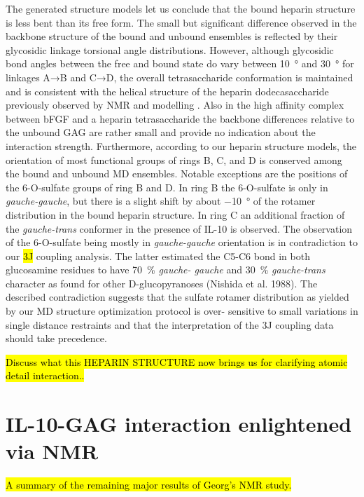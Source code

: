 The generated structure models let us conclude that the bound heparin structure
is less bent than its free form. The small but significant difference observed
in the backbone structure of the bound and unbound ensembles is reflected by
their glycosidic linkage torsional angle distributions. However, although
glycosidic bond angles between the free and bound state do vary between
\SI{10}{\degree} and \SI{30}{\degree} for linkages A→B and C→D, the overall
tetrasaccharide conformation is maintained and is consistent with the helical
structure of the heparin dodecasaccharide previously observed by NMR and
modelling \cite{foster_mulloy_1993}. Also in the high affinity complex between
bFGF and a heparin tetrasaccharide
\cite{faham_heparin_1996,mikhailov_hp_tetra_1996} the backbone differences
relative to the unbound GAG are rather small and provide no indication about the
interaction strength. Furthermore, according to our heparin structure models,
the orientation of most functional groups of rings B, C, and D is conserved
among the bound and unbound MD ensembles. Notable exceptions are the positions
of the 6-O-sulfate groups of ring B and D. In ring B the 6-O-sulfate is only in
\textit{gauche-gauche}, but there is a slight shift by about \SI{-10}{\degree}
of the rotamer distribution in the bound heparin structure. In ring C an
additional fraction of the \textit {gauche-trans} conformer in the presence of
IL-10 is observed. The observation of the 6-O-sulfate being mostly in \textit
{gauche-gauche} orientation is in contradiction to our \hl{3J} coupling
analysis. The latter estimated the C5-C6 bond in both glucosamine residues to
have \SI{70}{\percent} \textit{gauche- gauche} and \SI{30}{\percent} \textit
{gauche-trans} character as found for other D-glucopyranoses (Nishida et al.
1988). The described contradiction suggests that the sulfate rotamer
distribution as yielded by our MD structure optimization protocol is over-
sensitive to small variations in single distance restraints and that the
interpretation of the 3J coupling data should take precedence.


\hl{Discuss what this HEPARIN STRUCTURE now brings us for clarifying atomic
detail interaction..}


\section{IL-10-GAG interaction enlightened via NMR}
\hl{A summary of the remaining major results of Georg's NMR study.}
\lipsum[1]

